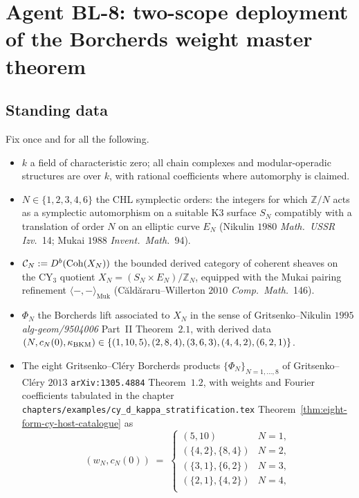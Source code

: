 \chapter*{Agent BL-8: two-scope deployment of the Borcherds weight master theorem}

\section*{Standing data}

Fix once and for all the following.

\begin{itemize}
\item $k$ a field of characteristic zero; all chain complexes and
modular-operadic structures are over $k$, with rational coefficients
where automorphy is claimed.
\item $N \in \{1, 2, 3, 4, 6\}$ the CHL symplectic orders: the integers
for which $\mathbb{Z}/N$ acts as a symplectic automorphism on a suitable
K$3$ surface $S_N$ compatibly with a translation of order $N$ on an
elliptic curve $E_N$ (Nikulin $1980$ \emph{Math.~USSR Izv.}~14; Mukai
$1988$ \emph{Invent.~Math.}~94).
\item $\mathcal{C}_N := D^b(\mathrm{Coh}(X_N))$ the bounded derived category of
coherent sheaves on the CY$_3$ quotient $X_N = (S_N \times E_N) / \mathbb{Z}_N$,
equipped with the Mukai pairing refinement $\langle -, - \rangle_{\mathrm{Muk}}$
(C\u{a}ld\u{a}raru--Willerton $2010$ \emph{Comp.~Math.}~146).
\item $\Phi_N$ the Borcherds lift associated to $X_N$ in the sense of
Gritsenko--Nikulin $1995$ \emph{alg-geom/9504006} Part~II Theorem~$2.1$,
with derived data $(N, c_N(0), \kappa_{\mathrm{BKM}}) \in
\{(1, 10, 5), (2, 8, 4), (3, 6, 3), (4, 4, 2), (6, 2, 1)\}$.
\item The eight Gritsenko--Cl\'ery Borcherds products
$\{\Phi_N\}_{N = 1, \dots, 8}$ of Gritsenko--Cl\'ery $2013$
\texttt{arXiv:1305.4884} Theorem~$1.2$, with weights and Fourier
coefficients tabulated in the chapter
\texttt{chapters/examples/cy\_d\_kappa\_stratification.tex}
Theorem~\ref{thm:eight-form-cy-host-catalogue} as
\[
 (w_N, c_N(0))
    \;=\;
 \begin{cases}
  (5, 10)           & N = 1, \\
  (\{4, 2\}, \{8, 4\}) & N = 2, \\
  (\{3, 1\}, \{6, 2\}) & N = 3, \\
  (\{2, 1\}, \{4, 2\}) & N = 4, \\

\end{cases}\]
\end{itemize}
